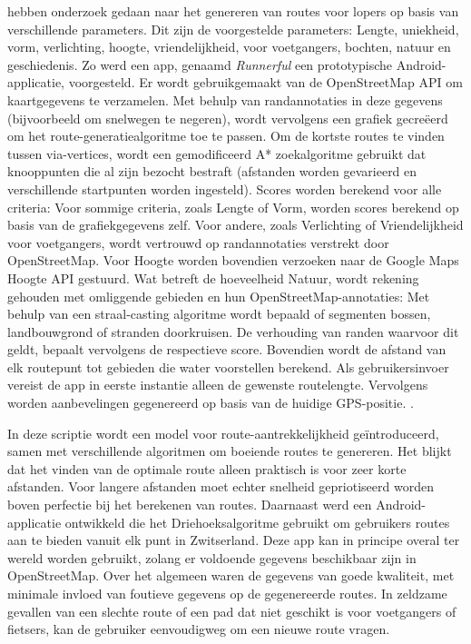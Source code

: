     
    \textcite{Loepp2018} hebben onderzoek gedaan naar het genereren van routes voor lopers op basis van verschillende parameters.
    Dit zijn de voorgestelde parameters: Lengte, uniekheid, vorm, verlichting, hoogte, vriendelijkheid, voor voetgangers, bochten, natuur en geschiedenis.
    Zo werd een app, genaamd \emph{Runnerful} een prototypische Android-applicatie, voorgesteld. Er wordt gebruikgemaakt van de OpenStreetMap API om kaartgegevens te verzamelen. 
    Met behulp van randannotaties in deze gegevens (bijvoorbeeld om snelwegen te negeren), 
    wordt vervolgens een grafiek gecreëerd om het route-generatiealgoritme toe te passen.
    Om de kortste routes te vinden tussen via-vertices, wordt een gemodificeerd A* zoekalgoritme gebruikt dat knooppunten 
    die al zijn bezocht bestraft (afstanden worden gevarieerd en verschillende startpunten worden ingesteld). 
    Scores worden berekend voor alle criteria: Voor sommige criteria, zoals Lengte of Vorm, worden scores berekend op basis van de grafiekgegevens zelf. 
    Voor andere, zoals Verlichting of Vriendelijkheid voor voetgangers, wordt vertrouwd op randannotaties verstrekt door OpenStreetMap. 
    Voor Hoogte worden bovendien verzoeken naar de Google Maps Hoogte API gestuurd. Wat betreft de hoeveelheid Natuur, wordt rekening gehouden met omliggende gebieden en hun OpenStreetMap-annotaties:
    Met behulp van een straal-casting algoritme wordt bepaald of segmenten bossen, landbouwgrond of stranden doorkruisen. De verhouding van randen waarvoor dit geldt, 
    bepaalt vervolgens de respectieve score. Bovendien wordt de afstand van elk routepunt tot gebieden die water voorstellen berekend. 
    Als gebruikersinvoer vereist de app in eerste instantie alleen de gewenste routelengte. 
    Vervolgens worden aanbevelingen gegenereerd op basis van de huidige GPS-positie. 
     \autocite{Loepp2018}.

     \hspace{2cm}

    \textcite{Schulze2016} In deze scriptie wordt een model voor route-aantrekkelijkheid geïntroduceerd, 
    samen met verschillende algoritmen om boeiende routes te genereren. 
    Het blijkt dat het vinden van de optimale route alleen praktisch is voor zeer korte afstanden. 
    Voor langere afstanden moet echter snelheid gepriotiseerd worden boven perfectie bij het berekenen van routes. 
    Daarnaast werd een Android-applicatie ontwikkeld die het Driehoeksalgoritme gebruikt om gebruikers routes aan te bieden
    vanuit elk punt in Zwitserland. Deze app kan in principe overal ter wereld worden gebruikt, 
    zolang er voldoende gegevens beschikbaar zijn in OpenStreetMap. Over het algemeen waren de gegevens van goede kwaliteit, 
    met minimale invloed van foutieve gegevens op de gegenereerde routes. 
    In zeldzame gevallen van een slechte route of een pad dat niet geschikt is voor voetgangers of fietsers, 
    kan de gebruiker eenvoudigweg om een nieuwe route vragen.

